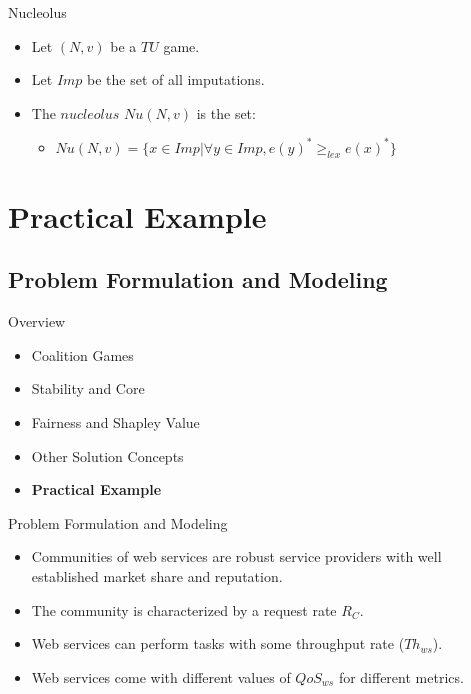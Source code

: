 \documentclass{beamer}
\begin{document}
\begin{frame}{Nucleolus}
    \begin{itemize}
        \item Let $(N,v)$ be a $TU$ game.
        \item Let $Imp$ be the set of all imputations.
        \item The {\color{blue}$nucleolus$ $Nu(N,v)$} is the set:
        \begin{itemize}
            \item $Nu(N,v) = \{x \in Imp | \forall y \in Imp, e(y)^* \geq_{lex} e(x)^*\}$
        \end{itemize}
    \end{itemize}
\end{frame}







\section{Practical Example}
\subsection{Problem Formulation and Modeling}


\begin{frame}{Overview}
    \begin{itemize}
     	\itemsep=.5cm
    	\item Coalition Games
    	\item Stability and Core
    	\item Fairness and Shapley Value
    	\item Other Solution Concepts
        \item {\bf Practical Example}
    \end{itemize}
\end{frame}


\begin{frame}{Problem Formulation and Modeling}
    \begin{itemize}
        \item Communities of web services are robust service providers with well established market share and reputation.
        \item The community is characterized by a request rate $R_C$.
        \item Web services can perform tasks with some throughput rate ($Th_{ws}$).
        \item Web services come with different values of $QoS_{ws}$ for different metrics.
    \end{itemize}
\end{frame}
\end{document}
